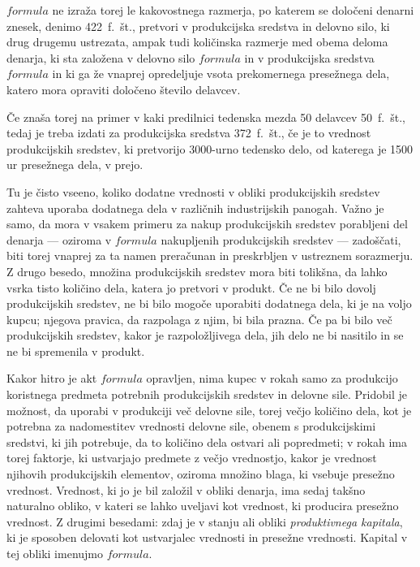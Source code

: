 \documentclass[a5paper]{scrbook}
\begin{document}
\( formula \) ne izraža torej le kakovostnega razmerja, po katerem se določeni denarni znesek, denimo 422~f.~št., pretvori v produkcijska sredstva in delovno silo, ki drug drugemu ustrezata, ampak tudi količinska razmerje med obema deloma denarja, ki sta založena v delovno silo \( formula \) in v produkcijska sredstva \( formula \) in ki ga že vnaprej opredeljuje vsota prekomernega presežnega dela, katero mora opraviti določeno število delavcev.

Če znaša torej na primer v kaki predilnici tedenska mezda 50 delavcev 50~f.~št., tedaj je treba izdati za produkcijska sredstva 372~f.~št., če je to vrednost produkcijskih sredstev, ki pretvorijo 3000-urno tedensko delo, od katerega je 1500 ur presežnega dela, v prejo.

Tu je čisto vseeno, koliko dodatne vrednosti v obliki produkcijskih sredstev zahteva uporaba dodatnega dela v različnih industrijskih panogah. Važno je samo, da mora v vsakem primeru za nakup produkcijskih sredstev porabljeni del denarja --- oziroma v \( formula \) nakupljenih produkcijskih sredstev --- zadoščati, biti torej vnaprej za ta namen preračunan in preskrbljen v ustreznem sorazmerju. Z drugo besedo, množina produkcijskih sredstev mora biti tolikšna, da lahko vsrka tisto količino dela, katera jo pretvori v produkt. Če ne bi bilo dovolj produkcijskih sredstev, ne bi bilo mogoče uporabiti dodatnega dela, ki je na voljo kupcu; njegova pravica, da razpolaga z njim, bi bila prazna. Če pa bi bilo več produkcijskih sredstev, kakor je razpoložljivega dela, jih delo ne bi nasitilo in se ne bi spremenila v produkt.

Kakor hitro je akt \( formula \) opravljen, nima kupec v rokah samo za produkcijo koristnega predmeta potrebnih produkcijskih sredstev in delovne sile. Pridobil je možnost, da uporabi v produkciji več delovne sile, torej večjo količino dela, kot je potrebna za nadomestitev vrednosti delovne sile, obenem s produkcijskimi sredstvi, ki jih potrebuje, da to količino dela ostvari ali popredmeti; v rokah ima torej faktorje, ki ustvarjajo predmete z večjo vrednostjo, kakor je vrednost njihovih produkcijskih elementov, oziroma množino blaga, ki vsebuje presežno vrednost. Vrednost, ki jo je bil založil v obliki denarja, ima sedaj takšno naturalno obliko, v kateri se lahko uveljavi kot vrednost, ki producira presežno vrednost. Z drugimi besedami: zdaj je v stanju ali obliki \emph{produktivnega kapitala}, ki je sposoben delovati kot ustvarjalec vrednosti in presežne vrednosti. Kapital v tej obliki imenujmo \( formula \).
\end{document}
